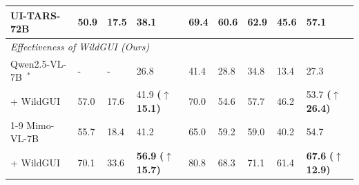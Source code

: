 \documentclass{article}
\theoremstyle{plain}
\theoremstyle{definition}
\theoremstyle{remark}
\newcommand{\imp}[1]{\textcolor{gaincolor}{\scriptsize\textbf{(\(\uparrow\)#1)}}}
\newcommand{\ourdataset}{WildGUI}
\begin{document}
\begin{table}[ht]
{\begin{tabular}{lllllllll}
UI-TARS-72B~\citep{qin2025ui} & 50.9 & 17.5 & 38.1 & 69.4 & 60.6 & 62.9 & 45.6 & 57.1 \\
\midrule
\multicolumn{9}{l}{\cellcolor{gray!15}\textit{Effectiveness of \ourdataset{} (Ours)}} \\
Qwen2.5-VL-7B~\citep{bai2025qwen2}$^*$ & - & - & 26.8 & 41.4 & 28.8 & 34.8 & 13.4 & 27.3\\
\quad + \ourdataset{} & 57.0 & 17.6 & 41.9 \imp{15.1} & 70.0  & 54.6 & 57.7 & 46.2  &  53.7 \imp{26.4} \\
\cmidrule(lr){1-9} %
Mimo-VL-7B~\citep{coreteam2025mimovltechnicalreport} & 55.7 & 18.4 & 41.2 & 65.0 & 59.2 & 59.0 & 40.2 & 54.7 \\
\quad + \ourdataset{} & 70.1 & 33.6 & \textbf{56.9} \imp{15.7} & 80.8 & 68.3 & 71.1 & 61.4 & \textbf{67.6} \imp{12.9}\\
\bottomrule
\end{tabular}
}
\label{tab: grounding benchmark}
\end{table}




\end{document}
